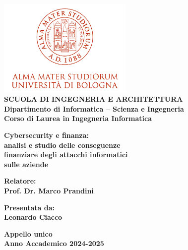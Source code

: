 \begin{titlepage}
\begin{center}
\includegraphics[width=2.56in]{figures/logo/logo_unibo.png}\\
\vspace{5mm}
{\small{\bf SCUOLA DI INGEGNERIA E ARCHITETTURA\\
\vspace{2mm}
Dipartimento di Informatica -- Scienza e Ingegneria\\
\vspace{2mm}
Corso di Laurea in Ingegneria Informatica }}
\end{center}
\vspace{1.2mm}
\begin{center}
{\LARGE{\bf Cybersecurity e finanza:\\
\vspace{4mm}
analisi e studio delle conseguenze\\
\vspace{4mm}
finanziare degli attacchi informatici\\
\vspace{4mm}
sulle aziende\\
\vspace{4mm}}}
  
\end{center}
\vspace{11.9mm}
\par
\noindent
\begin{minipage}[t]{0.47\textwidth}
{\normalsize{\bf Relatore:\\
Prof. Dr. Marco Prandini}}
\end{minipage}
\hfill
\begin{minipage}[t]{0.47\textwidth}\raggedleft
{\normalsize{\bf Presentata da:\\
Leonardo Ciacco}}
\end{minipage}
\vspace{15mm} %
\begin{center}
{\normalsize{\bf Appello unico\\%
Anno Accademico 2024-2025}}%
\end{center}
\end{titlepage}
